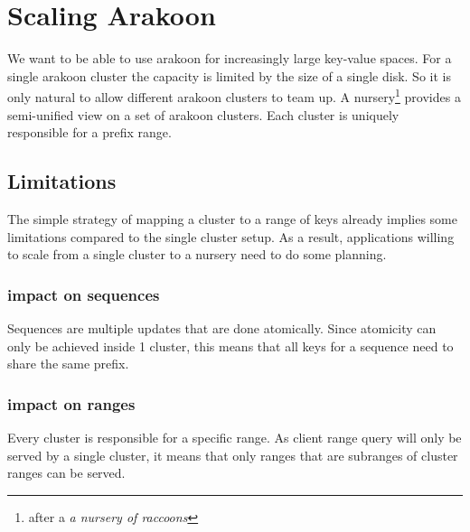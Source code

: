 \section{Scaling Arakoon}
We want to be able to use arakoon for increasingly large key-value spaces. 
For a single arakoon cluster the capacity is limited by the size of a single disk. 
So it is only natural to allow different arakoon clusters to team up. 
A nursery\footnote{after a \emph{a nursery of raccoons}} provides a semi-unified view on a set of arakoon clusters. 
Each cluster is uniquely responsible for a prefix range. 
\subsection{Limitations}
The simple strategy of mapping a cluster to a range of keys already implies some limitations compared to the single cluster setup. 
As a result, applications willing to scale from a single cluster to a nursery need to do some planning.
\subsubsection{impact on sequences}
Sequences are multiple updates that are done atomically. 
Since atomicity can only be achieved inside 1 cluster, this means that all keys for a sequence need to share the same prefix. 
\subsubsection{impact on ranges}
Every cluster is responsible for a specific range. 
As client range query will only be served by a single cluster, it means that only ranges that are subranges of cluster ranges can be served.
